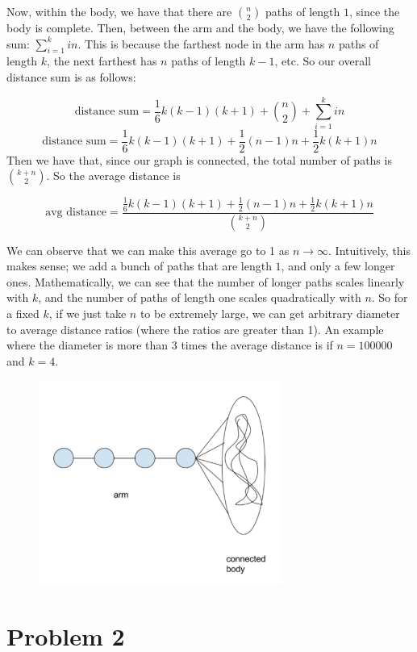 \documentclass{article}
\begin{document}
\noindent Now, within the body, we have that there are $\binom{n}{2}$ paths of 
length $1$, since the body is complete. Then, between the arm and the body,
we have the following sum: $\sum_{i = 1}^k i n$. This is because the farthest
node in the arm has $n$ paths of length $k$, the next farthest has $n$ paths of
length $k-1$, etc. So our overall distance sum is as follows:

\[ \text{distance sum} = \frac{1}{6} k (k - 1)(k + 1) + \binom{n}{2} + 
    \sum_{i = 1}^k i n \]
\[ \text{distance sum} = \frac{1}{6} k (k - 1)(k + 1) + \frac{1}{2}(n-1)n + 
    \frac{1}{2}k(k+1)n \]
Then we have that, since our graph is connected, the total number of paths is 
$\binom{k + n}{2}$. So the average distance is

\[ \text{avg distance} = \frac{\frac{1}{6} k (k - 1)(k + 1) + \frac{1}{2}(n-1)n + 
    \frac{1}{2}k(k+1)n}{\binom{k + n}{2}} \]

\noindent We can observe that we can make this average go to 1 as 
$n \rightarrow \infty$. Intuitively, this makes sense; we add a bunch of paths
that are length $1$, and only a few longer ones. Mathematically, we can see that
the number of longer paths scales linearly with $k$, and the number of paths 
of length one scales quadratically with $n$. So for a fixed $k$, if we just
take $n$ to be extremely large, we can get arbitrary diameter to average distance
ratios (where the ratios are greater than 1). An example where the diameter
is more than 3 times the average distance is if $n = 100000$ and $k = 4$.

\begin{figure}[h]
    \includegraphics[width=8cm]{graph1}
\end{figure}

\section*{Problem 2}
\end{document}
